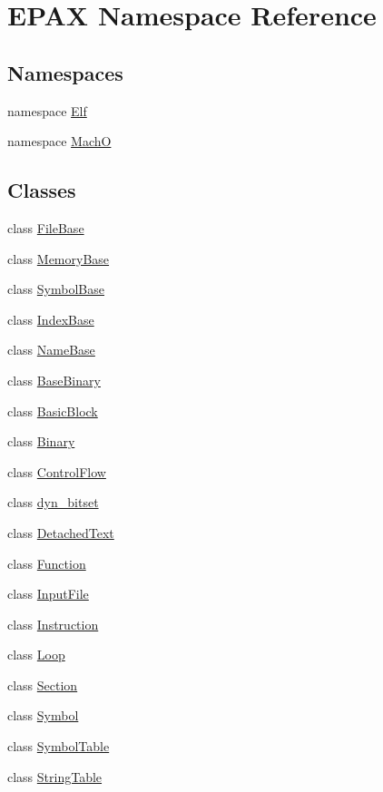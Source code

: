 \hypertarget{namespace_e_p_a_x}{\section{\-E\-P\-A\-X \-Namespace \-Reference}
\label{namespace_e_p_a_x}
}
\subsection*{\-Namespaces}
\begin{DoxyCompactItemize}
\item 
namespace \hyperlink{namespace_e_p_a_x_1_1_elf}{\-Elf}
\item 
namespace \hyperlink{namespace_e_p_a_x_1_1_mach_o}{\-Mach\-O}
\end{DoxyCompactItemize}
\subsection*{\-Classes}
\begin{DoxyCompactItemize}
\item 
class \hyperlink{class_e_p_a_x_1_1_file_base}{\-File\-Base}
\item 
class \hyperlink{class_e_p_a_x_1_1_memory_base}{\-Memory\-Base}
\item 
class \hyperlink{class_e_p_a_x_1_1_symbol_base}{\-Symbol\-Base}
\item 
class \hyperlink{class_e_p_a_x_1_1_index_base}{\-Index\-Base}
\item 
class \hyperlink{class_e_p_a_x_1_1_name_base}{\-Name\-Base}
\item 
class \hyperlink{class_e_p_a_x_1_1_base_binary}{\-Base\-Binary}
\item 
class \hyperlink{class_e_p_a_x_1_1_basic_block}{\-Basic\-Block}
\item 
class \hyperlink{class_e_p_a_x_1_1_binary}{\-Binary}
\item 
class \hyperlink{class_e_p_a_x_1_1_control_flow}{\-Control\-Flow}
\item 
class \hyperlink{class_e_p_a_x_1_1dyn__bitset}{dyn\-\_\-bitset}
\item 
class \hyperlink{class_e_p_a_x_1_1_detached_text}{\-Detached\-Text}
\item 
class \hyperlink{class_e_p_a_x_1_1_function}{\-Function}
\item 
class \hyperlink{class_e_p_a_x_1_1_input_file}{\-Input\-File}
\item 
class \hyperlink{class_e_p_a_x_1_1_instruction}{\-Instruction}
\item 
class \hyperlink{class_e_p_a_x_1_1_loop}{\-Loop}
\item 
class \hyperlink{class_e_p_a_x_1_1_section}{\-Section}
\item 
class \hyperlink{class_e_p_a_x_1_1_symbol}{\-Symbol}
\item 
class \hyperlink{class_e_p_a_x_1_1_symbol_table}{\-Symbol\-Table}
\item 
class \hyperlink{class_e_p_a_x_1_1_string_table}{\-String\-Table}
\end{DoxyCompactItemize}
